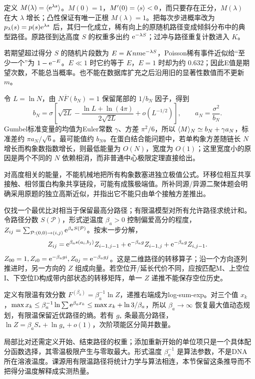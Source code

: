 定义 $M(\lambda)=\langle \mathrm e^{\lambda s}\rangle$。$M(0)=1$，$M'(0)=\langle s\rangle<0$，而只要存在正分，$M(\lambda)$ 在大 $\lambda$ 增长；凸性保证有唯一正根 $M(\lambda)=1$。把每次步进概率改为 $p_\lambda(s)=p(s)\mathrm e^{\lambda s}$ 后，其归一化成立，稀有向上的原随机路径变成倾斜分布中的典型路径。原路径到达高度 $S$ 的权重多出约 $\mathrm e^{-\lambda S}$；过冲与路径重复计数进入 $K$。

若期望超过得分 $S$ 的随机片段数为 $E=Knm\mathrm e^{-\lambda S}$，Poisson稀有事件近似给“至少一个”为 $1-\mathrm e^{-E}$。$E\ll1$ 时它约等于 $E$，$E=1$ 时却为约 $0.632$；因此E值是期望次数，不能总当概率。也不能在数据库扩充之后沿用旧的显著性数值而不更新 $m$。

令 $L=\ln N$，由 $N\overline F(b_N)=1$ 保留尾部的 $1/b_N$ 因子，得到
\[
b_N=\sigma\left[\sqrt{2L}-\frac{\ln L+\ln(4\pi)}{2\sqrt{2L}}+o(L^{-1/2})\right],\qquad a_N=\frac{\sigma^2}{b_N}.
\]
Gumbel标准变量的均值为Euler常数 $\gamma$、方差 $\pi^2/6$，所以 $\langle M\rangle_N\simeq b_N+\gamma a_N$，标准差约 $\pi a_N/\sqrt6$。最可能值约 $b_N$。在蛋白结合能问题中，若单构象方差随链长 $N$ 增长而构象数指数增长，则最低能量为 $O(N)$，宽度为 $O(1)$；这里宽度小的原因是两个不同的 $N$ 依赖相消，而非普通中心极限定理直接给出。

对高度相关的能量，不能机械地把所有构象数塞进独立极值公式。环移位相互共享接触、相邻蛋白构象共享链段，可能有成簇极端值。所补同源/异源二聚体题会明确采用原题的独立高斯近似，并指出它不能只由单个接触方差推出。

仅找一个最优比对相当于保留最高分路径；有限温模型对所有允许路径求统计和。令路径分数 $S(\mathcal P)$，形式逆温度 $\beta_a>0$ 控制偏爱高分的程度，$Z_{ij}=\sum_{\mathcal P:(0,0)\to(i,j)}\mathrm e^{\beta_aS(\mathcal P)}$。按末一步分解，
\[
Z_{ij}=\mathrm e^{\beta_as(a_i,b_j)}Z_{i-1,j-1}
+\mathrm e^{-\beta_ag}Z_{i-1,j}+\mathrm e^{-\beta_ag}Z_{i,j-1}.
\]
$Z_{00}=1,Z_{i0}=\mathrm e^{-\beta_agi},Z_{0j}=\mathrm e^{-\beta_agj}$。这是二维路径的转移算子；沿一个方向逐列推进时，另一方向的 $Z$ 组成向量。若空位开/延长代价不同，应按匹配M、上空位I、下空位D构成带内部状态的转移矩阵，单一 $Z$ 递推不能保存空位历史。

定义有限温有效分数 $F^{(\beta_a)}=\beta_a^{-1}\ln Z$，递推右端成为log-sum-exp。对三个值 $x_k$，$\max x_k\le\beta_a^{-1}\ln\sum\mathrm e^{\beta_ax_k}\le\max x_k+\ln3/\beta_a$，所以 $\beta_a\to\infty$ 恢复最大值动态规划，有限温保留近优路径的熵。若有 $g_*$ 条最高分路径，$\ln Z=\beta_aS_*+\ln g_*+o(1)$，次阶项能区分简并数量。

局部比对还需定义开始、结束路径的权重；添加重新开始的单位项只是一个具体配分函数选择，其零温极限产生与零取最大。形式温度 $\beta_a^{-1}$ 是算法参数，不是DNA所在溶液温度。课源用有限温路径将统计力学与算法相连，本节保留这条推导而不把得分温度解释成实测热量。
